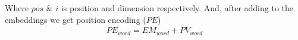 \documentclass[%
	BCOR=8mm, %
	DIV=12,
	toc=bibliography, %
	toc=listof, %
	oneside, %
	egregdoesnotlikesansseriftitles, %
	]{scrbook}
\begin{document}
Where $pos$ \& $i$ is position and dimension respectively. And, after adding to the embeddings we get position encoding ($PE$)
\begin{equation}
\begin{aligned}
    PE_{word} =EM_{word}+PV_{word}\\
    \label{eq:PE}
\end{aligned}
\end{equation}

%
\end{document}
